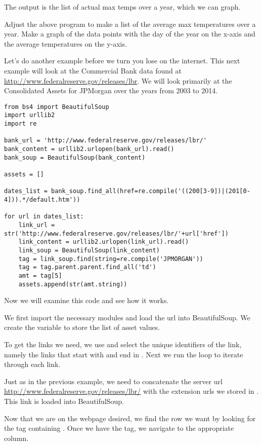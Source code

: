 The output is the list of actual max temps over a year, which we can graph.

\begin{problem}
Adjust the above program to make a list of the average max temperatures over a year.
Make a graph of the data points with the day of the year on the x-axis and the average temperatures on the y-axis.
\end{problem}

Let's do another example before we turn you lose on the internet.
This next example will look at the Commercial Bank data found at \url{http://www.federalreserve.gov/releases/lbr}.
We will look primarily at the Consolidated Assets for JPMorgan over the years from 2003 to 2014.

\begin{lstlisting}
from bs4 import BeautifulSoup
import urllib2
import re

bank_url = 'http://www.federalreserve.gov/releases/lbr/'
bank_content = urllib2.urlopen(bank_url).read()
bank_soup = BeautifulSoup(bank_content)

assets = []

dates_list = bank_soup.find_all(href=re.compile('((200[3-9])|(201[0-4])).*/default.htm'))

for url in dates_list:
    link_url = str('http://www.federalreserve.gov/releases/lbr/'+url['href'])
    link_content = urllib2.urlopen(link_url).read()
    link_soup = BeautifulSoup(link_content)
    tag = link_soup.find(string=re.compile('JPMORGAN'))
    tag = tag.parent.parent.find_all('td')
    amt = tag[5]
    assets.append(str(amt.string))
\end{lstlisting}
Now we will examine this code and see how it works.

We first import the necessary modules and load the url into BeautifulSoup.
We create the variable  to store the list of asset values.

To get the links we need, we use  and select the unique identifiers of the link, namely the links that start with  and end in .
Next we run the  loop to iterate through each link.

Just as in the previous example, we need to concatenate the server url \url{http://www.federalreserve.gov/releases/lbr/} with the extension urls we stored in .
This link is loaded into BeautifulSoup.

Now that we are on the webpage desired, we find the row we want by looking for the tag containing . Once we have the tag, we navigate to the appropriate column.

